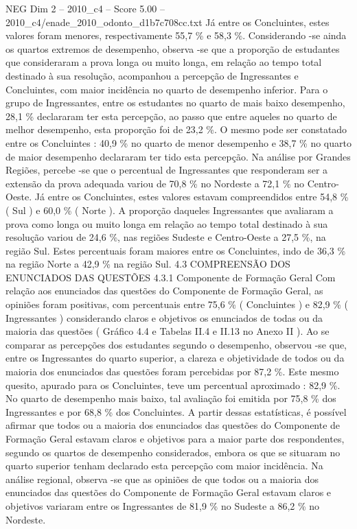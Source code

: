 \begin{textsample}{NEG Dim 2 – 2010\_c4 – Score 5.00 – 2010\_c4/enade\_2010\_odonto\_d1b7c708cc.txt}
Já entre os Concluintes, estes valores foram menores, respectivamente 55,7 \% e 58,3 \%.
Considerando -se ainda os quartos extremos de desempenho, observa -se que a proporção de estudantes que consideraram a prova longa ou muito longa, em relação ao tempo total destinado à sua resolução, acompanhou a percepção de Ingressantes e Concluintes, com maior incidência no quarto de desempenho inferior.
Para o grupo de Ingressantes, entre os estudantes no quarto de mais baixo desempenho, 28,1 \% declararam ter esta percepção, ao passo que entre aqueles no quarto de melhor desempenho, esta proporção foi de 23,2 \%.
O mesmo pode ser constatado entre os Concluintes : 40,9 \% no quarto de menor desempenho e 38,7 \% no quarto de maior desempenho declararam ter tido esta percepção.
Na análise por Grandes Regiões, percebe -se que o percentual de Ingressantes que responderam ser a extensão da prova adequada variou de 70,8 \% no Nordeste a 72,1 \% no Centro-Oeste.
Já entre os Concluintes, estes valores estavam compreendidos entre 54,8 \% ( Sul ) e 60,0 \% ( Norte ).
A proporção daqueles Ingressantes que avaliaram a prova como longa ou muito longa em relação ao tempo total destinado à sua resolução variou de 24,6 \%, nas regiões Sudeste e Centro-Oeste a 27,5 \%, na região Sul.
Estes percentuais foram maiores entre os Concluintes, indo de 36,3 \% na região Norte a 42,9 \% na região Sul. 4.3 COMPREENSÃO DOS ENUNCIADOS DAS QUESTÕES 4.3.1 Componente de Formação Geral Com relação aos enunciados das questões do Componente de Formação Geral, as opiniões foram positivas, com percentuais entre 75,6 \% ( Concluintes ) e 82,9 \% ( Ingressantes ) considerando claros e objetivos os enunciados de todas ou da maioria das questões ( Gráfico 4.4 e Tabelas II.4 e II.13 no Anexo II ).
Ao se comparar as percepções dos estudantes segundo o desempenho, observou -se que, entre os Ingressantes do quarto superior, a clareza e objetividade de todos ou da maioria dos enunciados das questões foram percebidas por 87,2 \%.
Este mesmo quesito, apurado para os Concluintes, teve um percentual aproximado : 82,9 \%.
No quarto de desempenho mais baixo, tal avaliação foi emitida por 75,8 \% dos Ingressantes e por 68,8 \% dos Concluintes.
A partir dessas estatísticas, é possível afirmar que todos ou a maioria dos enunciados das questões do Componente de Formação Geral estavam claros e objetivos para a maior parte dos respondentes, segundo os quartos de desempenho considerados, embora os que se situaram no quarto superior tenham declarado esta percepção com maior incidência.
Na análise regional, observa -se que as opiniões de que todos ou a maioria dos enunciados das questões do Componente de Formação Geral estavam claros e objetivos variaram entre os Ingressantes de 81,9 \% no Sudeste a 86,2 \% no Nordeste.

\end{textsample}
